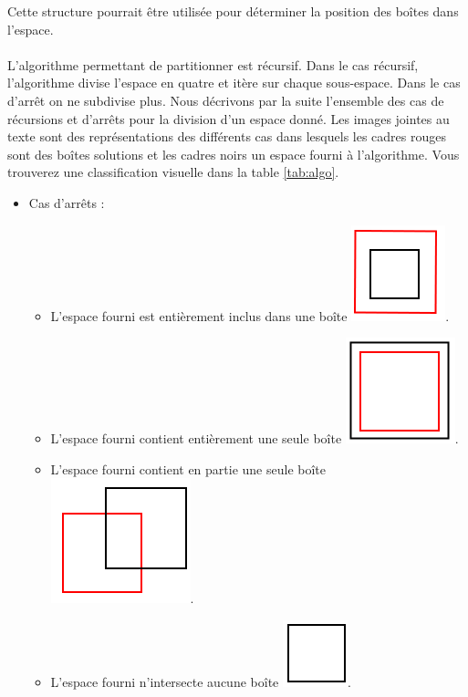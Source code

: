 Cette structure pourrait être utilisée pour déterminer la position des boîtes dans l'espace.

\paragraph{}L'algorithme permettant de partitionner est récursif. Dans le cas récursif, l'algorithme divise l'espace en quatre et itère sur chaque sous-espace. Dans le cas d'arrêt on ne subdivise plus. Nous décrivons par la suite l'ensemble des cas de récursions et d'arrêts pour la division d'un espace donné. Les images jointes au texte sont des représentations des différents cas dans lesquels les cadres rouges sont des boîtes solutions et les cadres noirs un espace fourni à l'algorithme. Vous trouverez une classification visuelle dans la table \ref{tab:algo}.
\begin{itemize}
\item Cas d'arrêts : 
\begin{itemize}
\item L'espace fourni est entièrement inclus dans une boîte \includegraphics[scale=0.20]{img/QT1}.
\item L'espace fourni contient entièrement une seule boîte \includegraphics[scale=0.20]{img/QT2}.
\item L'espace fourni contient en partie une seule boîte \includegraphics[scale=0.20]{img/QT3}.
\item L'espace fourni n'intersecte aucune boîte \includegraphics[scale=0.30]{img/QT6}.

\end{itemize}
\end{itemize}
